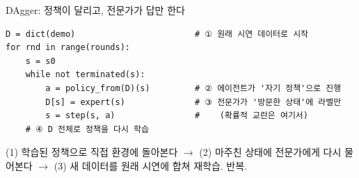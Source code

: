 \begin{frame}[fragile]{DAgger: 정책이 달리고, 전문가가 답만 한다}
  \begin{lstlisting}
D = dict(demo)                        # ① 원래 시연 데이터로 시작
for rnd in range(rounds):
    s = s0
    while not terminated(s):
        a = policy_from(D)(s)         # ② 에이전트가 '자기 정책'으로 진행
        D[s] = expert(s)              # ③ 전문가가 '방문한 상태'에 라벨만
        s = step(s, a)                #    (확률적 교란은 여기서)
    # ④ D 전체로 정책을 다시 학습
  \end{lstlisting}
  {\footnotesize (1) 학습된 정책으로 직접 환경에 돌아본다 $\to$
  (2) 마주친 상태에 전문가에게 다시 물어본다 $\to$ (3) 새 데이터를
  원래 시연에 합쳐 재학습. 반복.}
\end{frame}
